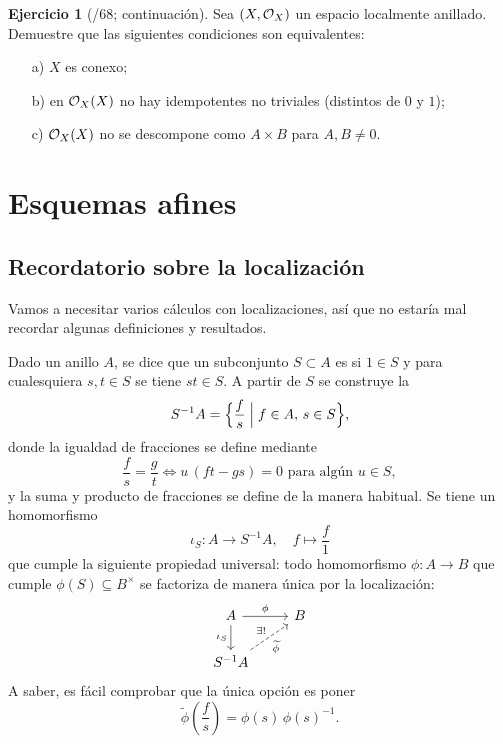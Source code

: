 \documentclass{article}
\numberwithin{equation}{section}
\newcounter{ejerctot}
\newcommand{\ejerccount}{\stepcounter{ejerctot}\theejerctot/68}
\theoremstyle{definition}
\newtheorem{ejerc}{Ejercicio}[section]
\begin{document}
\begin{ejerc}[\ejerccount; continuación]
  \label{ejerc:componentes-conexas-en-ELA-2}
  Sea $(X, \mathcal{O}_X)$ un espacio localmente anillado. Demuestre que las siguientes
  condiciones son equivalentes:

  \begin{enumerate}
  \item[a)] $X$ es conexo;
  \item[b)] en $\mathcal{O}_X (X)$ no hay idempotentes no triviales
    (distintos de $0$ y $1$);
  \item[c)] $\mathcal{O}_X (X)$ no se descompone como $A\times B$ para $A,B \ne 0$.
  \end{enumerate}
\end{ejerc}


\pagebreak
\section{Esquemas afines}
\label{sec:esquemas-afines}


\subsection{Recordatorio sobre la localización}

Vamos a necesitar varios cálculos con localizaciones, así que no estaría mal
recordar algunas definiciones y resultados.

\vspace{1em}

Dado un anillo $A$, se dice que un subconjunto $S \subset A$
es  si $1 \in S$ y para cualesquiera $s,t \in S$ se tiene
$st \in S$. A partir de $S$ se construye la 
$$S^{-1} A = \Bigl\{ \frac{f}{s} \Bigm| f \in A, \, s \in S \Bigr\},$$
donde la igualdad de fracciones se define mediante
$$\frac{f}{s} = \frac{g}{t} \iff u\,(ft - gs) = 0\text{ para algún }u\in S,$$
y la suma y producto de fracciones se define de la manera habitual. Se tiene
un homomorfismo
$$\iota_S\colon A\to S^{-1} A, \quad f \mapsto \frac{f}{1}$$
que cumple la siguiente propiedad universal: todo homomorfismo
$\phi\colon A\to B$ que cumple $\phi (S) \subseteq B^\times$ se factoriza
de manera única por la localización:
\[ \begin{tikzcd}
A \ar{r}{\phi}\ar{d}[swap]{\iota_S} & B \\
S^{-1} A\ar[dashed]{ur}{\exists!}[swap]{\widetilde{\phi}}
\end{tikzcd} \]
A saber, es fácil comprobar que la única opción es poner
$$\widetilde{\phi} \left(\frac{f}{s}\right) = \phi (s)\,\phi (s)^{-1}.$$
\end{document}
